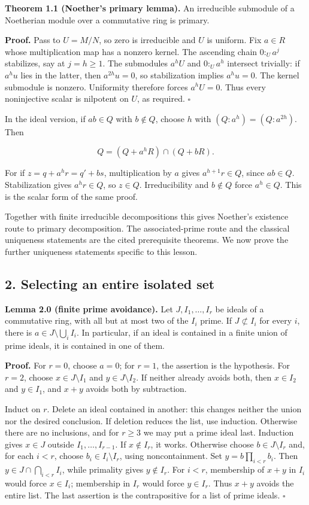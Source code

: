 \documentclass[
]{article}
\begin{document}
\textbf{Theorem 1.1 (Noether's primary lemma).} An irreducible submodule
of a Noetherian module over a commutative ring is primary.

\textbf{Proof.} Pass to \(U=M/N\), so zero is irreducible and \(U\) is
uniform. Fix \(a\in R\) whose multiplication map has a nonzero kernel.
The ascending chain \(0:_U a^j\) stabilizes, say at \(j=h\ge1\). The
submodules \(a^hU\) and \(0:_U a^h\) intersect trivially: if \(a^hu\)
lies in the latter, then \(a^{2h}u=0\), so stabilization implies
\(a^hu=0\). The kernel submodule is nonzero. Uniformity therefore forces
\(a^hU=0\). Thus every noninjective scalar is nilpotent on \(U\), as
required. \(\square\)

In the ideal version, if \(ab\in Q\) with \(b\notin Q\), choose \(h\)
with \((Q:a^h)=(Q:a^{2h})\). Then

\[
Q=(Q+a^hR)\cap(Q+bR).
\]

For if \(z=q+a^hr=q'+bs\), multiplication by \(a\) gives
\(a^{h+1}r\in Q\), since \(ab\in Q\). Stabilization gives \(a^hr\in Q\),
so \(z\in Q\). Irreducibility and \(b\notin Q\) force \(a^h\in Q\). This
is the scalar form of the same proof.

Together with finite irreducible decompositions this gives Noether's
existence route to primary decomposition. The associated-prime route and
the classical uniqueness statements are the cited prerequisite theorems.
We now prove the further uniqueness statements specific to this lesson.

\subsection{2. Selecting an entire isolated
set}\label{selecting-an-entire-isolated-set}

\textbf{Lemma 2.0 (finite prime avoidance).} Let \(J,I_1,\ldots,I_r\) be
ideals of a commutative ring, with all but at most two of the \(I_i\)
prime. If \(J\not\subset I_i\) for every \(i\), there is
\(a\in J\setminus\bigcup_i I_i\). In particular, if an ideal is
contained in a finite union of prime ideals, it is contained in one of
them.

\textbf{Proof.} For \(r=0\), choose \(a=0\); for \(r=1\), the assertion
is the hypothesis. For \(r=2\), choose \(x\in J\setminus I_1\) and
\(y\in J\setminus I_2\). If neither already avoids both, then
\(x\in I_2\) and \(y\in I_1\), and \(x+y\) avoids both by subtraction.

Induct on \(r\). Delete an ideal contained in another: this changes
neither the union nor the desired conclusion. If deletion reduces the
list, use induction. Otherwise there are no inclusions, and for
\(r\ge3\) we may put a prime ideal last. Induction gives \(x\in J\)
outside \(I_1,\ldots,I_{r-1}\). If \(x\notin I_r\), it works. Otherwise
choose \(b\in J\setminus I_r\) and, for each \(i<r\), choose
\(b_i\in I_i\setminus I_r\), using noncontainment. Set
\(y=b\prod_{i<r}b_i\). Then \(y\in J\cap\bigcap_{i<r}I_i\), while
primality gives \(y\notin I_r\). For \(i<r\), membership of \(x+y\) in
\(I_i\) would force \(x\in I_i\); membership in \(I_r\) would force
\(y\in I_r\). Thus \(x+y\) avoids the entire list. The last assertion is
the contrapositive for a list of prime ideals. \(\square\)
\end{document}
